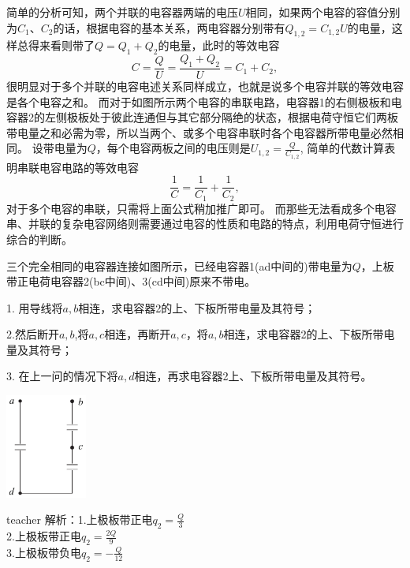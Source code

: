 简单的分析可知，两个并联的电容器两端的电压$U$相同，如果两个电容的容值分别为$C_1$、$C_2$的话，根据电容的基本关系，两电容器分别带有$Q_{1,2} = C_{1,2}U$的电量，这样总得来看则带了$Q=Q_1+Q_2$的电量，此时的等效电容
\begin{equation}
C = \frac{Q}{U} = \frac{Q_1+Q_2}{U} = C_1+C_2,
\end{equation}
很明显对于多个并联的电容电述关系同样成立，也就是说多个电容并联的等效电容是各个电容之和。
而对于如图所示两个电容的串联电路，电容器1的右侧极板和电容器2的左侧极板处于彼此连通但与其它部分隔绝的状态，根据电荷守恒它们两板带电量之和必需为零，所以当两个、或多个电容串联时各个电容器所带电量必然相同。
设带电量为$Q$，每个电容两板之间的电压则是$U_{1,2} = \frac{Q}{C_{1,2}}$,
简单的代数计算表明串联电容电路的等效电容
\begin{equation}
\frac{1}{C} = \frac{1}{C_1}+\frac{1}{C_2},  
\end{equation}
对于多个电容的串联，只需将上面公式稍加推广即可。
而那些无法看成多个电容串、并联的复杂电容网络则需要通过电容的性质和电路的特点，利用电荷守恒进行综合的判断。




\begin{example}

三个完全相同的电容器连接如图所示，已经电容器1(ad中间的)带电量为$Q$，上板带正电荷电容器2(bc中间)、3(cd中间)原来不带电。

1. 用导线将$a,b$相连，求电容器2的上、下板所带电量及其符号；

2.然后断开$a,b$,将$a,c$相连，再断开$a,c$，将$a,b$相连，求电容器2的上、下板所带电量及其符号；

3. 在上一问的情况下将$a,d$相连，再求电容器2上、下板所带电量及其符号。
\begin{flushright}
\includegraphics[width = 0.2\textwidth]{images/elec-problem-15.pdf} 
\end{flushright}
\begin{taggedblock}{teacher}
\noindent
解析：1.上极板带正电$q_2=\frac{Q}{3}$
\\2.上极板带正电$q_2=\frac{2Q}{9}$
\\3.上极板带负电$q_2=-\frac{Q}{12}$
\end{taggedblock}
\end{example}


